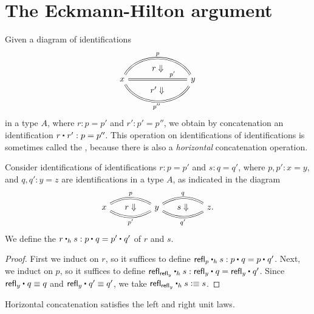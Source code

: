 \section{The Eckmann-Hilton argument}

Given a diagram of identifications
\begin{equation*}
\begin{tikzcd}[column sep=7em]
x \arrow[r,equals,bend left=60,"p",""{name=A,below}] \arrow[r,equals,""{name=B},""{name=E,below},"{p'}"{near end}] \arrow[r,equals,bend right=60,"{p''}"{below},""{name=F,above}] \arrow[from=A,to=B,phantom,"r\Downarrow"] \arrow[from=E,to=F,phantom,"{r'\Downarrow}"] 
& y
\end{tikzcd}
\end{equation*}
in a type $A$, where $r:p=p'$ and $r':p'=p''$,
we obtain by concatenation an identification $\ct{r}{r'}:p=p''$. This operation on identifications of identifications is sometimes called the , because there is also a \emph{horizontal} concatenation operation.

\begin{defn}
Consider identifications of identifications $r:p=p'$ and $s:q=q'$, where $p,p':x=y$, and $q,q':y=z$ are identifications in a type $A$, as indicated in the diagram
\begin{equation*}
\begin{tikzcd}[column sep=huge]
x \arrow[r,equals,bend left=30,"p",""{name=A,below}] \arrow[r,equals,bend right=30,""{name=B,above},"{p'}"{below}] \arrow[from=A,to=B,phantom,"r\Downarrow"] & y \arrow[r,equals,bend left=30,"q",""{name=C,below}] \arrow[r,equals,bend right=30,""{name=D,above},"{q'}"{below}] \arrow[from=C,to=D,phantom,"s\Downarrow"] & z.
\end{tikzcd}
\end{equation*}
We define the  $\ct[h]{r}{s}:\ct{p}{q}=\ct{p'}{q'}$ of $r$ and $s$.
\end{defn}

\begin{proof}
First we induct on $r$, so it suffices to define $\ct[h]{\refl{p}}{s}:\ct{p}{q}=\ct{p}{q'}$. 
Next, we induct on $p$, so it suffices to define $\ct[h]{\refl{\refl{y}}}{s}:\ct{\refl{y}}{q}=\ct{\refl{y}}{q'}$. 
Since $\ct{\refl{y}}{q}\jdeq q$ and $\ct{\refl{y}}{q'}\jdeq q'$, we take $\ct[h]{\refl{\refl{y}}}{s}\defeq s$. 
\end{proof}

\begin{lem}
Horizontal concatenation satisfies the left and right unit laws.
\end{lem}

